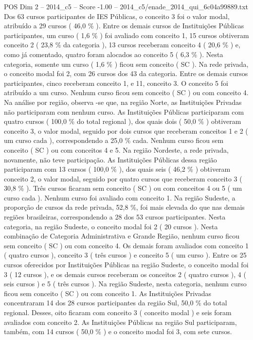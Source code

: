 \begin{textsample}{POS Dim 2 – 2014\_c5 – Score -1.00 – 2014\_c5/enade\_2014\_qui\_6c04a99889.txt}
Dos 63 cursos participantes de IES Públicas, o conceito 3 foi o valor modal, atribuído a 29 cursos ( 46,0 \% ).
Entre os demais cursos de Instituições Públicas participantes, um curso ( 1,6 \% ) foi avaliado com conceito 1, 15 cursos obtiveram conceito 2 ( 23,8 \% da categoria ), 13 cursos receberam conceito 4 ( 20,6 \% ) e, como já comentado, quatro foram alocados ao conceito 5 ( 6,3 \% ).
Nesta categoria, somente um curso ( 1,6 \% ) ficou sem conceito ( SC ).
Na rede privada, o conceito modal foi 2, com 26 cursos dos 43 da categoria.
Entre os demais cursos participantes, cinco receberam conceito 1, e 11, conceito 3.
O conceito 5 foi atribuído a um curso.
Nenhum curso ficou sem conceito ( SC ) ou com conceito 4.
Na análise por região, observa -se que, na região Norte, as Instituições Privadas não participaram com nenhum curso.
As Instituições Públicas participaram com quatro cursos ( 100,0 \% do total regional ), dos quais dois ( 50,0 \% ) obtiveram conceito 3, o valor modal, seguido por dois cursos que receberam conceitos 1 e 2 ( um curso cada ), correspondendo a 25,0 \% cada.
Nenhum curso ficou sem conceito ( SC ) ou com conceitos 4 e 5.
Na região Nordeste, a rede privada, novamente, não teve participação.
As Instituições Públicas dessa região participaram com 13 cursos ( 100,0 \% ), dos quais seis ( 46,2 \% ) obtiveram conceito 2, o valor modal, seguido por quatro cursos que receberam conceito 3 ( 30,8 \% ).
Três cursos ficaram sem conceito ( SC ) ou com conceitos 4 ou 5 ( um curso cada ).
Nenhum curso foi avaliado com conceito 1.
Na região Sudeste, a proporção de cursos da rede privada, 52,8 \%, foi mais elevada do que nas demais regiões brasileiras, correspondendo a 28 dos 53 cursos participantes.
Nesta categoria, na região Sudeste, o conceito modal foi 2 ( 20 cursos ).
Nesta combinação de Categoria Administrativa e Grande Região, nenhum curso ficou sem conceito ( SC ) ou com conceito 4.
Os demais foram avaliados com conceito 1 ( quatro cursos ), conceito 3 ( três cursos ) e conceito 5 ( um curso ).
Entre os 25 cursos oferecidos por Instituições Públicas na região Sudeste, o conceito modal foi 3 ( 12 cursos ), e os demais cursos receberam os conceitos 2 ( quatro cursos ), 4 ( seis cursos ) e 5 ( três cursos ).
Na região Sudeste, nesta categoria, nenhum curso ficou sem conceito ( SC ) ou com conceito 1.
As Instituições Privadas concentraram 14 dos 28 cursos participantes da região Sul, 50,0 \% do total regional.
Desses, oito ficaram com conceito 3 ( conceito modal ) e seis foram avaliados com conceito 2.
As Instituições Públicas na região Sul participaram, também, com 14 cursos ( 50,0 \% ) e o conceito modal foi 3, com sete cursos.

\end{textsample}
